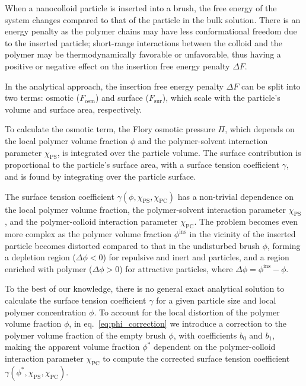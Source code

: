 \documentclass[10pt, a4paper]{article}
\begin{document}
\begin{multicols}{2}
When a nanocolloid particle is inserted into a brush, the free energy of the system changes compared to that of the particle in the bulk solution.
There is an energy penalty as the polymer chains may have less conformational freedom due to the inserted particle; short-range interactions between the colloid and the polymer may be thermodynamically favorable or unfavorable, thus having a positive or negative effect on the insertion free energy penalty $\Delta F$.

In the analytical approach, the insertion free energy penalty $\Delta F$ can be split into two terms: osmotic ($F_{\text{osm}}$) and surface ($F_{\text{sur}}$), which scale with the particle's volume and surface area, respectively.

To calculate the osmotic term, the Flory osmotic pressure $\Pi$, which depends on the local polymer volume fraction $\phi$ and the polymer-solvent interaction parameter $\chi_{\text{PS}}$, is integrated over the particle volume.
The surface contribution is proportional to the particle's surface area, with a surface tension coefficient $\gamma$, and is found by integrating over the particle surface.

The surface tension coefficient $\gamma(\phi, \chi_{\text{PS}}, \chi_{\text{PC}})$ has a non-trivial dependence on the local polymer volume fraction, the polymer-solvent interaction parameter $\chi_{\text{PS}}$, and the polymer-colloid interaction parameter $\chi_{\text{PC}}$.
The problem becomes even more complex as the polymer volume fraction $\phi^{\text{ins}}$ in the vicinity of the inserted particle becomes distorted compared to that in the undisturbed brush $\phi$, forming a depletion region ($\Delta \phi < 0$) for repulsive and inert and particles, and a region enriched with polymer ($\Delta \phi > 0$) for attractive particles, where $\Delta \phi = \phi^{\text{ins}} - \phi$.


To the best of our knowledge, there is no general exact analytical solution to calculate the surface tension coefficient $\gamma$ for a given particle size and local polymer concentration $\phi$.
To account for the local distortion of the polymer volume fraction $\phi$, in eq.~\ref{eq:phi_correction} we introduce a correction to the polymer volume fraction of the empty brush $\phi$, with coefficients $b_0$ and $b_1$, making the apparent volume fraction $\phi^{\ast}$ dependent on the polymer-colloid interaction parameter $\chi_{\text{PC}}$ to compute the corrected surface tension coefficient $\gamma(\phi^{\ast}, \chi_{\text{PS}}, \chi_{\text{PC}})$.


\end{multicols}
\end{document}
